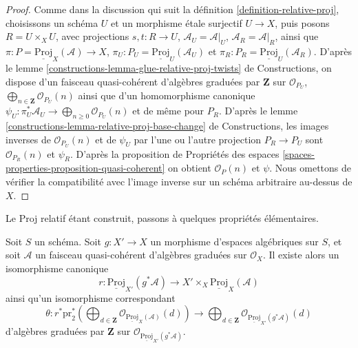 \begin{proof}
Comme dans la discussion qui suit la définition \ref{definition-relative-proj},
choisissons un schéma $U$ et un morphisme \'etale surjectif
$U \to X$, puis posons $R = U \times_X U$, avec projections $s, t : R \to U$,
$\mathcal{A}_U = \mathcal{A}|_U$, $\mathcal{A}_R = \mathcal{A}|_R$,
ainsi que $\pi : P = \underline{\text{Proj}}_X(\mathcal{A}) \to X$,
$\pi_U : P_U = \underline{\text{Proj}}_U(\mathcal{A}_U)$ et
$\pi_R : P_R = \underline{\text{Proj}}_U(\mathcal{A}_R)$.
D'après le
lemme \ref{constructions-lemma-glue-relative-proj-twists} de Constructions,
on dispose d'un faisceau quasi-cohérent d'algèbres graduées par $\mathbf{Z}$
sur $\mathcal{O}_{P_U}$,
$\bigoplus_{n \in \mathbf{Z}} \mathcal{O}_{P_U}(n)$
ainsi que d'un homomorphisme canonique
$\psi_U : \pi_U^*\mathcal{A}_U \to \bigoplus_{n \geq 0} \mathcal{O}_{P_U}(n)$
et de même pour $P_R$. D'après le
lemme \ref{constructions-lemma-relative-proj-base-change} de Constructions,
les images inverses de $\mathcal{O}_{P_U}(n)$ et de $\psi_U$ par l'une ou l'autre projection
$P_R \to P_U$ sont $\mathcal{O}_{P_R}(n)$ et $\psi_R$.
D'après la proposition de Propriétés des espaces
\ref{spaces-properties-proposition-quasi-coherent}
on obtient $\mathcal{O}_{P}(n)$ et $\psi$.
Nous omettons de vérifier la compatibilité avec l'image inverse sur
un schéma arbitraire au-dessus de $X$.
\end{proof}

\noindent
Le Proj relatif étant construit, passons à quelques propriétés
élémentaires.

\begin{lemma}
\label{lemma-relative-proj-base-change}
Soit $S$ un schéma. Soit $g : X' \to X$ un morphisme d'espaces algébriques
sur $S$, et soit $\mathcal{A}$ un faisceau quasi-cohérent
d'algèbres graduées sur $\mathcal{O}_X$. Il existe alors un isomorphisme canonique
$$
r :
\underline{\text{Proj}}_{X'}(g^*\mathcal{A})
\longrightarrow
X' \times_X \underline{\text{Proj}}_X(\mathcal{A})
$$
ainsi qu'un isomorphisme correspondant
$$
\theta :
r^*\text{pr}_2^*\left(\bigoplus\nolimits_{d \in \mathbf{Z}}
\mathcal{O}_{\underline{\text{Proj}}_X(\mathcal{A})}(d)\right)
\longrightarrow
\bigoplus\nolimits_{d \in \mathbf{Z}}
\mathcal{O}_{\underline{\text{Proj}}_{X'}(g^*\mathcal{A})}(d)
$$
d'algèbres graduées par $\mathbf{Z}$
sur $\mathcal{O}_{\underline{\text{Proj}}_{X'}(g^*\mathcal{A})}$.
\end{lemma}

